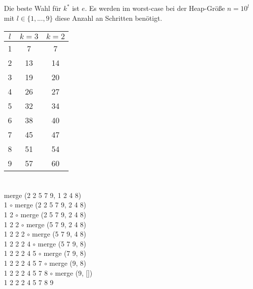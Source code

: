 \documentclass[10pt,a4paper,oneside,ngerman,numbers=noenddot]{scrartcl}
\begin{document}
	\subsection{} %
		Die beste Wahl für $k^{*}$ ist $e$. Es werden im worst-case bei der Heap-Größe $n=10^{l}$ mit $l \in \{1,...,9\}$ diese Anzahl an Schritten benötigt.
		
		\begin{tabular}{c|c|c}
			$l$ & $k = 3$ & $k = 2$ \\
			\hline
			1 & 7 & 7 \\
			2 & 13 & 14 \\
			3 & 19 & 20 \\
			4 & 26 & 27 \\
			5 & 32 & 34 \\
			6 & 38 & 40 \\
			7 & 45 & 47 \\ 
			8 & 51 & 54 \\
			9 & 57 & 60
		\end{tabular}
	\subsection{} %
	\subsection{} %
	\subsection{} %
	\subsection{} %
\section{} %
	\subsection{} %
		merge (2 2 5 7 9, 1 2 4 8)  \\
		1 $\circ$ merge (2 2 5 7 9, 2 4 8) \\
		1 2 $\circ$ merge (2 5 7 9, 2 4 8) \\
		1 2 2 $\circ$ merge (5 7 9, 2 4 8) \\
		1 2 2 2 $\circ$ merge (5 7 9, 4 8) \\
		1 2 2 2 4 $\circ$ merge (5 7 9, 8) \\
		1 2 2 2 4 5 $\circ$ merge (7 9, 8) \\
		1 2 2 2 4 5 7 $\circ$ merge (9, 8) \\
		1 2 2 2 4 5 7 8 $\circ$ merge (9, []) \\
		1 2 2 2 4 5 7 8 9
\end{document}
